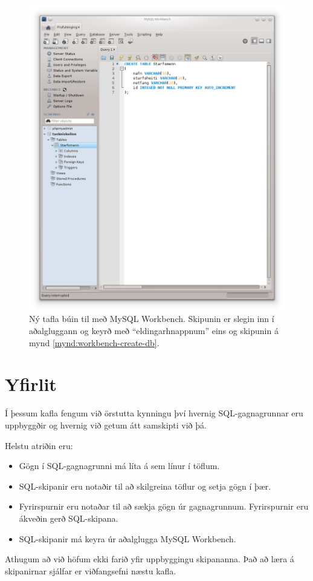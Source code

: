\begin{figure}
\caption[Ný tafla]{Ný tafla búin til með MySQL Workbench. Skipunin er slegin inn í aðalgluggann og keyrð með ``eldingarhnappnum'' eins og skipunin á mynd \ref{mynd:workbench-create-db}.}
\label{mynd:workbench-create-table}
\centering
\includegraphics[width=0.8\linewidth]{myndir/workbench-create-table}
\end{figure}

\newpage
\section{Yfirlit}
Í þessum kafla fengum við örstutta kynningu því hvernig SQL-gagnagrunnar eru uppbyggðir og hvernig við getum átt samskipti við þá. 

Helstu atriðin eru:
\begin{itemize}
 \item Gögn í SQL-gagnagrunni má líta á sem línur í töflum.
 \item SQL-skipanir eru notaðir til að skilgreina töflur og setja gögn í þær.
 \item Fyrirspurnir eru notaðar til að sækja gögn úr gagnagrunnum. Fyrirspurnir eru ákveðin gerð SQL-skipana.
 \item SQL-skipanir má keyra úr aðalglugga MySQL Workbench.
\end{itemize}
Athugum að við höfum ekki farið yfir uppbyggingu skipananna. Það að læra á skipanirnar sjálfar er viðfangsefni næstu kafla.